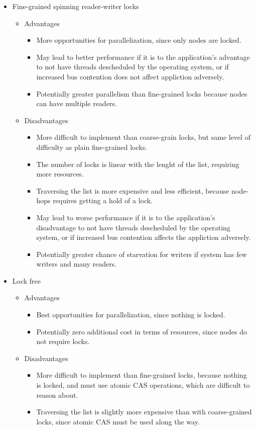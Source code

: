\documentclass[11pt]{article}
\begin{document}
\begin{itemize}
\item Fine-grained spinning reader-writer locks
\begin{itemize}
\item Advantages
\begin{itemize}
\item More opportunities for parallelization, since only nodes are locked.
\item
May lead to better performance if it is to the application's advantage to not
have threads descheduled by the operating system, or if increased bus contention
does not affect appliction adversely.
\item
Potentially greater parallelism than fine-grained locks because nodes can have
multiple readers.
\end{itemize}
\item Disadvantages
\begin{itemize}
\item
More difficult to implement than coarse-grain locks, but same level of
difficulty as plain fine-grained locks.
\item
The number of locks is linear with the lenght of the list, requiring more
resources.
\item
Traversing the list is more expensive and less efficient, because node-hops
requires getting a hold of a lock.
\item
May lead to worse performance if it is to the application's disadvantage to not
have threads descheduled by the operating system, or if increased bus contention
affects the appliction adversely.
\item
Potentially greater chance of starvation for writers if system has few writers
and many readers.
\end{itemize}
\end{itemize}

\item Lock free
\begin{itemize}
\item Advantages
\begin{itemize}
\item Best opportunities for parallelization, since nothing is locked.
\item
Potentially zero additional cost in terms of resources, since nodes do not
require locks.
\end{itemize}
\item Disadvantages
\begin{itemize}
\item
More difficult to implement than fine-grained locks, because nothing is locked,
and must use atomic CAS operations, which are difficult to reason about.
\item
Traversing the list is slightly more expensive than with coarse-grained locks,
since atomic CAS must be used along the way.
\end{itemize}
\end{itemize}
\end{itemize}
\end{document}

